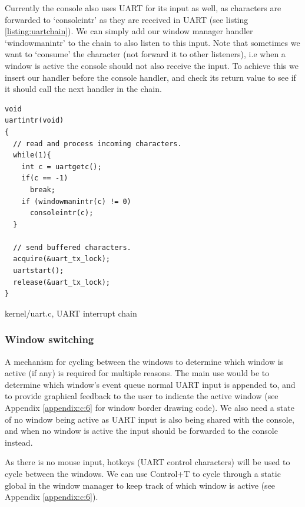 Currently the console also uses UART for its input as well, as characters are
forwarded to `consoleintr' as they are received in UART (see listing \ref{listing:uartchain}).
We can simply add our window manager handler `windowmanintr' to the chain to also
listen to this input. Note that sometimes we want to `consume' the character 
(not forward it to other listeners), i.e when a window is active the console
should not also receive the input. To achieve this we insert our handler before
the console handler, and check its return value to see if it should call the next
handler in the chain.

\begin{listing}
    \begin{verbatim}
void
uartintr(void)
{
  // read and process incoming characters.
  while(1){
    int c = uartgetc();
    if(c == -1)
      break;
    if (windowmanintr(c) != 0)
      consoleintr(c);
  }

  // send buffered characters.
  acquire(&uart_tx_lock);
  uartstart();
  release(&uart_tx_lock);
}

    \end{verbatim}
    \caption{kernel/uart.c, UART interrupt chain}
    \label{listing:uartchain}
\end{listing}

\subsubsection{Window switching}
A mechanism for cycling between the windows to determine which window is active
(if any) is required for multiple reasons. The main use would be to determine
which window's event queue normal UART input is appended to, and to provide
graphical feedback to the user to indicate the active window (see Appendix
\ref{appendix:c:6} for window border drawing code). We also need a
state of no window being active as UART input is also being shared with the console,
and when no window is active the input should be forwarded to the console instead.

As there is no mouse input, hotkeys (UART control characters) 
will be used to cycle between the windows. We can use Control+T to cycle
through a static global in the window manager to keep track of which window
is active (see Appendix \ref{appendix:c:6}). 

